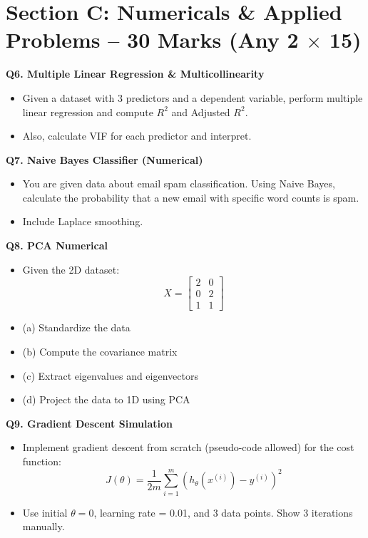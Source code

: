 \documentclass[12pt]{article}
\begin{document}
\section*{Section C: Numericals \& Applied Problems – 30 Marks (Any 2 $\times$ 15)}

\textbf{Q6. Multiple Linear Regression \& Multicollinearity}
\begin{itemize}
  \item Given a dataset with 3 predictors and a dependent variable, perform multiple linear regression and compute $R^2$ and Adjusted $R^2$.
  \item Also, calculate VIF for each predictor and interpret.
\end{itemize}

\textbf{Q7. Naive Bayes Classifier (Numerical)}
\begin{itemize}
  \item You are given data about email spam classification. Using Naive Bayes, calculate the probability that a new email with specific word counts is spam.
  \item Include Laplace smoothing.
\end{itemize}

\textbf{Q8. PCA Numerical}
\begin{itemize}
  \item Given the 2D dataset:
  \[
  X = \begin{bmatrix}
  2 & 0 \\
  0 & 2 \\
  1 & 1
  \end{bmatrix}
  \]
  \item (a) Standardize the data  
  \item (b) Compute the covariance matrix  
  \item (c) Extract eigenvalues and eigenvectors  
  \item (d) Project the data to 1D using PCA
\end{itemize}

\textbf{Q9. Gradient Descent Simulation}
\begin{itemize}
  \item Implement gradient descent from scratch (pseudo-code allowed) for the cost function:
  \[
  J(\theta) = \frac{1}{2m} \sum_{i=1}^{m} (h_\theta(x^{(i)}) - y^{(i)})^2
  \]
  \item Use initial $\theta = 0$, learning rate = 0.01, and 3 data points. Show 3 iterations manually.
\end{itemize}
\end{document}
